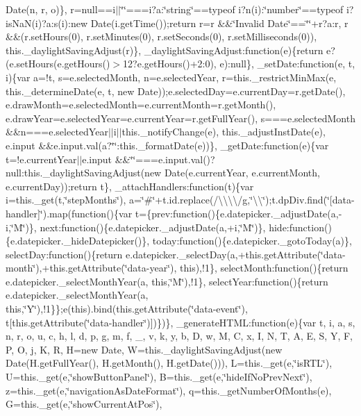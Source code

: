 {{\begin{DoxyParamCaption}
Date(n, r, o)\}, r=null==i$\vert$$\vert$\char`\"{}\char`\"{}===i?a\+:\char`\"{}string\char`\"{}==typeof i?n(i)\+:\char`\"{}number\char`\"{}==typeof i?is\+Na\+N(i)?a\+:s(i)\+:new Date(i.\+get\+Time());return r=r \&\&\char`\"{}\+Invalid Date\char`\"{}==\char`\"{}\char`\"{}+r?a\+:r, r \&\&(r.\+set\+Hours(0), r.\+set\+Minutes(0), r.\+set\+Seconds(0), r.\+set\+Milliseconds(0)), this.\+\_\+daylight\+Saving\+Adjust(r)\}, \+\_\+daylight\+Saving\+Adjust\+:function(e)\{return e?(e.\+set\+Hours(e.\+get\+Hours()$>$12?e.\+get\+Hours()+2\+:0), e)\+:null\}, \+\_\+set\+Date\+:function(e, t, i)\{var a=!t, s=e.\+selected\+Month, n=e.\+selected\+Year, r=this.\+\_\+restrict\+Min\+Max(e, this.\+\_\+determine\+Date(e, t, new Date));e.\+selected\+Day=e.\+current\+Day=r.\+get\+Date(), e.\+draw\+Month=e.\+selected\+Month=e.\+current\+Month=r.\+get\+Month(), e.\+draw\+Year=e.\+selected\+Year=e.\+current\+Year=r.\+get\+Full\+Year(), s===e.\+selected\+Month \&\&n===e.\+selected\+Year$\vert$$\vert$i$\vert$$\vert$this.\+\_\+notify\+Change(e), this.\+\_\+adjust\+Inst\+Date(e), e.\+input \&\&e.\+input.\+val(a?\char`\"{}\char`\"{}\+:this.\+\_\+format\+Date(e))\}, \+\_\+get\+Date\+:function(e)\{var t=!e.\+current\+Year$\vert$$\vert$e.\+input \&\&\char`\"{}\char`\"{}===e.\+input.\+val()?null\+:this.\+\_\+daylight\+Saving\+Adjust(new Date(e.\+current\+Year, e.\+current\+Month, e.\+current\+Day));return t\}, \+\_\+attach\+Handlers\+:function(t)\{var i=this.\+\_\+get(t,\char`\"{}step\+Months\char`\"{}), a=\char`\"{}\#\char`\"{}+t.\+id.\+replace(/\textbackslash{}\textbackslash{}\textbackslash{}\textbackslash{}/g,\char`\"{}\textbackslash{}\textbackslash{}\char`\"{});t.\+dp\+Div.\+find(\char`\"{}\mbox{[}data-\/handler\mbox{]}\char`\"{}).\+map(function()\{var t=\{prev\+:function()\{e.\+datepicker.\+\_\+adjust\+Date(a,-\/i,\char`\"{}\+M\char`\"{})\}, next\+:function()\{e.\+datepicker.\+\_\+adjust\+Date(a,+i,\char`\"{}\+M\char`\"{})\}, hide\+:function()\{e.\+datepicker.\+\_\+hide\+Datepicker()\}, today\+:function()\{e.\+datepicker.\+\_\+goto\+Today(a)\}, select\+Day\+:function()\{return e.\+datepicker.\+\_\+select\+Day(a,+this.\+get\+Attribute(\char`\"{}data-\/month\char`\"{}),+this.\+get\+Attribute(\char`\"{}data-\/year\char`\"{}), this),!1\}, select\+Month\+:function()\{return e.\+datepicker.\+\_\+select\+Month\+Year(a, this,\char`\"{}\+M\char`\"{}),!1\}, select\+Year\+:function()\{return e.\+datepicker.\+\_\+select\+Month\+Year(a, this,\char`\"{}\+Y\char`\"{}),!1\}\};e(this).\+bind(this.\+get\+Attribute(\char`\"{}data-\/event\char`\"{}), t\mbox{[}this.\+get\+Attribute(\char`\"{}data-\/handler\char`\"{})\mbox{]})\})\}, \+\_\+generate\+H\+T\+M\+L\+:function(e)\{var t, i, a, s, n, r, o, u, c, h, l, d, p, g, m, f, \+\_\+, v, k, y, b, D, w, M, C, x, I, N, T, A, E, S, Y, F, P, O, j, K, R, H=new Date, W=this.\+\_\+daylight\+Saving\+Adjust(new Date(\+H.\+get\+Full\+Year(), H.\+get\+Month(), H.\+get\+Date())), L=this.\+\_\+get(e,\char`\"{}is\+R\+T\+L\char`\"{}), U=this.\+\_\+get(e,\char`\"{}show\+Button\+Panel\char`\"{}), B=this.\+\_\+get(e,\char`\"{}hide\+If\+No\+Prev\+Next\char`\"{}), z=this.\+\_\+get(e,\char`\"{}navigation\+As\+Date\+Format\char`\"{}), q=this.\+\_\+get\+Number\+Of\+Months(e), G=this.\+\_\+get(e,\char`\"{}show\+Current\+At\+Pos\char`\"{}), 
\end{DoxyParamCaption}}}
